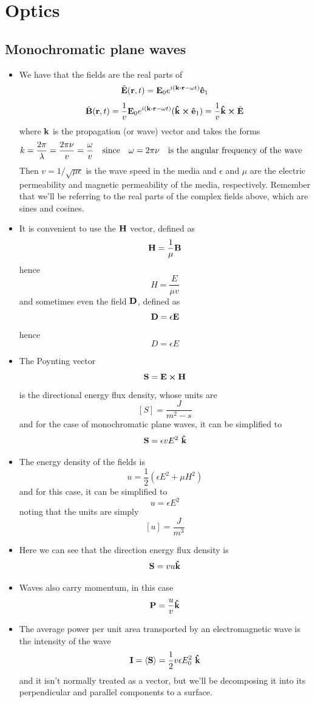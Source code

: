 \documentclass[oneside, 12pt]{book}
\begin{document}
\pagestyle{mypage2}
\chapter{Optics}
\section{Monochromatic plane waves}
\begin{itemize}
    \item We have that the fields are the real parts of
    $$\tilde{\vb{E}}(\vb{r}, t) = \vb{E}_0e^{i(\vb{k}\vdot \vb{r} - \omega t)}\vu{e}_1$$
    $$\tilde{\vb{B}}(\vb{r}, t) = \frac{1}{v}\vb{E}_0e^{i(\vb{k}\vdot \vb{r} - \omega t)}(\vu{k}\cross \vu{e}_1) = \frac{1}{v}\vu{k} \cross \tilde{\vb{E}}$$
    where $\vb{k}$ is the propagation (or wave) vector and takes the forms
    $$k = \frac{2\pi}{\lambda} = \frac{2\pi \nu}{v} = \frac{\omega}{v}\qq{since} \omega = 2\pi \nu \qq{is the angular frequency of the wave}$$
    Then $v = 1/\sqrt{\mu \epsilon}$ is the wave speed in the media and $\epsilon$ and $\mu$ are the electric permeability  and magnetic permeability of the media, respectively. Remember that we'll be referring to the real parts of the complex fields above, which are sines and cosines.
    \item It is convenient to use the $\vb{H}$ vector, defined as
    $$\vb{H} = \frac{1}{\mu}\vb{B}$$
    hence
    $$H = \frac{E}{\mu v}$$
    and sometimes even the field $\vb{D}$, defined as
    $$\vb{D} = \epsilon \vb{E}$$
    hence
    $$D=\epsilon E$$
    \item The Poynting vector 
    $$\vb{S} = \vb{E}\cross\vb{H}$$
    is the directional energy flux density, whose units are
    $$[S] = \frac{J}{m^2-s}$$
    and for the case of monochromatic plane waves, it can be simplified to
    $$\vb{S} =\epsilon v E^2\ \vu{k}$$
    \item The energy density of the fields is
    $$u=\frac{1}{2}(\epsilon E^2 + \mu H^2)$$
    and for this case, it can be simplified to
    $$u= \epsilon E^2$$
    noting that the units are simply $$[u] = \frac{J}{m^3}$$
    \item Here we can see that the direction energy flux density is
    $$\vb{S} = vu\vu{k}$$
    \item Waves also carry momentum, in this case
    $$\vb{P} = \frac{u}{v}\vu{k}$$
    \item The average power per unit area transported by an electromagnetic wave is the intensity of the wave
    $$\vb{I} = \left< \vb{S} \right> = \frac{1}{2}v\epsilon E_0^2\ \vu{k}$$
    and it isn't normally treated as a vector, but we'll be decomposing it into its perpendicular and parallel components to a surface.
    \end{itemize}
    
\end{document}
